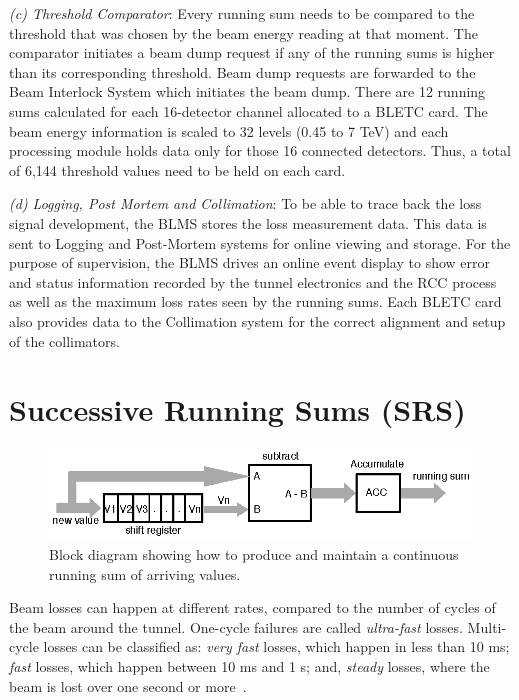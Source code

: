 \documentclass{llncs}
\begin{document}
\emph{(c) Threshold Comparator}: Every running sum needs to be compared to the threshold that was chosen by the beam energy reading at that moment.
The comparator initiates a beam dump request if any of the running sums is higher than its corresponding threshold.
Beam dump requests are forwarded to the Beam Interlock System which initiates the beam dump.
There are 12 running sums calculated for each 16-detector channel allocated to a BLETC card.
The beam energy information is scaled to 32 levels (0.45 to 7 TeV) and each processing module holds data only for those 16 connected detectors.
Thus, a total of 6,144 threshold values need to be held on each card.

\emph{(d) Logging, Post Mortem and Collimation}:  To be able to trace back the loss signal development, the BLMS stores the loss measurement data.
This data is sent to Logging and Post-Mortem systems for online viewing and storage.
For the purpose of supervision, the BLMS drives an online event display to show error and status information recorded by the tunnel electronics and the RCC process as well as the maximum loss rates seen by the running sums.
Each BLETC card also provides data to the Collimation system for the correct alignment and setup of the collimators.

\section{Successive Running Sums (SRS)}
\label{sec-SRS}

\begin{figure}[t]
  \centering \includegraphics{rs.eps}
   \caption{Block diagram showing how to produce and maintain a continuous running sum of arriving values.}
  \label{fig:RS-basic}
\end{figure}

Beam losses can happen at different rates, compared to the number of cycles of the beam around the tunnel.
One-cycle failures are called \emph{ultra-fast} losses.
Multi-cycle losses can be classified as: \emph{very fast} losses, which happen in less than 10 ms; \emph{fast} losses, which happen between 10 ms and 1 s; and, \emph{steady} losses, where the beam is lost over one second or more~\cite{Schmidt-ICFA}.
\end{document}
